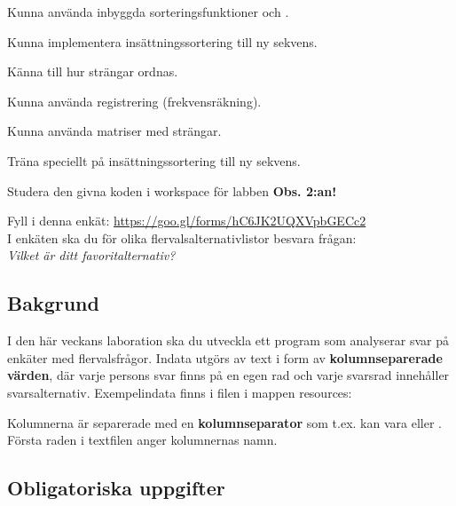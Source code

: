 
\Lab{\LabWeekTWELVE}

\begin{Goals}
\item Kunna använda inbyggda sorteringsfunktioner  och .
\item Kunna implementera insättningssortering till ny sekvens.
\item Känna till hur strängar ordnas.
\item Kunna använda registrering (frekvensräkning).
\item Kunna använda matriser med strängar.
\end{Goals}

\begin{Preparations}
\item {}
\item {} Träna speciellt på insättningssortering till ny sekvens.
\item \ReadTheLab
\item Studera den givna koden i workspace för labben  \textbf{Obs. 2:an!}
\item Fyll i denna enkät: \url{https://goo.gl/forms/hC6JK2UQXVpbGECc2}  \\
I enkäten ska du för olika flervalsalternativlistor besvara frågan: \\ \textit{Vilket är ditt favoritalternativ?}
\end{Preparations}


\subsection{Bakgrund}

I den här veckans laboration ska du utveckla ett program som analyserar svar på enkäter med flervalsfrågor. Indata utgörs av text i form av \textbf{kolumnseparerade värden}, där varje persons svar finns på en egen rad och varje svarsrad innehåller svarsalternativ.
Exempelindata finns i filen  i mappen resources:

Kolumnerna är separerade med en \textbf{kolumnseparator} som t.ex. kan vara  eller . Första raden i textfilen anger kolumnernas namn.


\subsection{Obligatoriska uppgifter}

